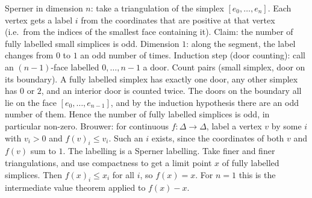 \documentclass[11pt,a4paper]{article}
\begin{document}
 Sperner in dimension $n$: take a triangulation of the simplex $[e_0,\dots,e_n]$. Each vertex gets a label $i$ from the coordinates that are positive at that vertex (i.e.\ from the indices of the smallest face containing it). Claim: the number of fully labelled small simplices is odd. Dimension $1$: along the segment, the label changes from $0$ to $1$ an odd number of times.
 Induction step (door counting): call an $(n-1)$-face labelled $0,\dots,n-1$ a door. Count pairs (small simplex, door on its boundary). A fully labelled simplex has exactly one door, any other simplex has $0$ or $2$, and an interior door is counted twice.
 The doors on the boundary all lie on the face $[e_0,\dots,e_{n-1}]$, and by the induction hypothesis there are an odd number of them. Hence the number of fully labelled simplices is odd, in particular non-zero.
 Brouwer: for continuous $f:\Delta\to\Delta$, label a vertex $v$ by some $i$ with $v_i>0$ and $f(v)_i\le v_i$. Such an $i$ exists, since the coordinates of both $v$ and $f(v)$ sum to $1$. The labelling is a Sperner labelling. Take finer and finer triangulations, and use compactness to get a limit point $x$ of fully labelled simplices. Then $f(x)_i\le x_i$ for all $i$, so $f(x)=x$. For $n=1$ this is the intermediate value theorem applied to $f(x)-x$.
\end{document}

